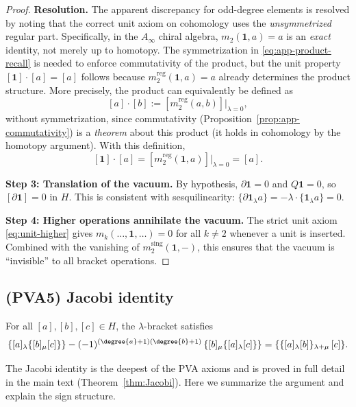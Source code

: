 \begin{proof}
\noindent\textbf{Resolution.} The apparent discrepancy for odd-degree elements is resolved by noting that the correct unit axiom on cohomology uses the \emph{unsymmetrized} regular part. Specifically, in the $A_\infty$ chiral algebra, $m_2(\mathbf{1},a) = a$ is an \emph{exact} identity, not merely up to homotopy. The symmetrization in \eqref{eq:app-product-recall} is needed to enforce commutativity of the product, but the unit property $[\mathbf{1}]\cdot[a] = [a]$ follows because $m_2^{\mathrm{reg}}(\mathbf{1},a) = a$ already determines the product structure. More precisely, the product can equivalently be defined as
\[
[a]\cdot [b] := [m_2^{\mathrm{reg}}(a,b)]\big|_{\lambda=0},
\]
without symmetrization, since commutativity (Proposition~\ref{prop:app-commutativity}) is a \emph{theorem} about this product (it holds in cohomology by the homotopy argument). With this definition,
\[
[\mathbf{1}]\cdot [a] = [m_2^{\mathrm{reg}}(\mathbf{1},a)]\big|_{\lambda=0} = [a].
\]

\textbf{Step 3: Translation of the vacuum.}
By hypothesis, $\partial\mathbf{1} = 0$ and $Q\mathbf{1} = 0$, so $[\partial\mathbf{1}] = 0$ in $H$. This is consistent with sesquilinearity: $\{\partial\mathbf{1}{}_\lambda a\} = -\lambda\cdot\{\mathbf{1}{}_\lambda a\} = 0$.

\textbf{Step 4: Higher operations annihilate the vacuum.}
The strict unit axiom \eqref{eq:unit-higher} gives $m_k(\ldots,\mathbf{1},\ldots) = 0$ for all $k\neq 2$ whenever a unit is inserted. Combined with the vanishing of $m_2^{\mathrm{sing}}(\mathbf{1},-)$, this ensures that the vacuum is ``invisible'' to all bracket operations.
\end{proof}

\subsection{(PVA5) Jacobi identity}

\begin{proposition}
\label{prop:app-Jacobi}
For all $[a],[b],[c]\in H$, the $\lambda$-bracket satisfies
\begin{equation}
\label{eq:app-Jacobi}
\{[a]{}_\lambda \{[b]{}_\mu [c]\}\} - (-1)^{(\degree{a}+1)(\degree{b}+1)}\,\{[b]{}_\mu \{[a]{}_\lambda [c]\}\} = \{\{[a]{}_\lambda [b]\}{}_{\lambda+\mu}\, [c]\}.
\end{equation}
\end{proposition}

The Jacobi identity is the deepest of the PVA axioms and is proved in full detail in the main text (Theorem~\ref{thm:Jacobi}). Here we summarize the argument and explain the sign structure.

